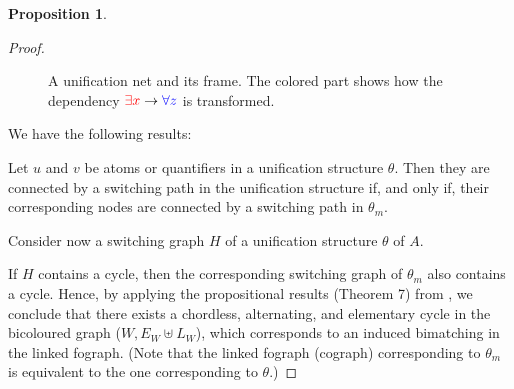 \documentclass[conference,twosided,10pt]{IEEEtran}
\theoremstyle{definition}
\newtheorem{proposition}[thm]{Proposition}
\newcommand{\cor}{\vee}
\newcommand{\cand}{\wedge}
\begin{document}
\begin{proposition}
\begin{proof}
\begin{figure}
\begin{center}

\caption{A unification net and its frame. The colored part shows how the
dependency ${\color{red} \exists x} \rightarrow {\color{blue} \forall z}$ is
transformed.}
\end{center}
\end{figure}

We have the following results: 

Let $u$ and $v$ be atoms or quantifiers in a unification structure $\theta$. Then they are connected by a switching path in the unification structure if, and only if, their corresponding nodes are connected by a switching path in $\theta_m$.

Consider now a switching graph $H$ of a unification structure $\theta$ of $A$.

If $H$ contains a cycle, then the corresponding switching graph of $\theta_m$
also contains a cycle. Hence, by applying the propositional results (Theorem 7)
from \cite{retore:03}, we conclude that there exists a chordless, alternating, and elementary cycle in the bicoloured graph ($W, E_W \uplus L_W$), which corresponds to an induced bimatching in the linked fograph. (Note that the linked fograph (cograph) corresponding to $\theta_m$ is equivalent to the one corresponding to $\theta$.)

\end{proof}
\end{proposition}
\end{document}
